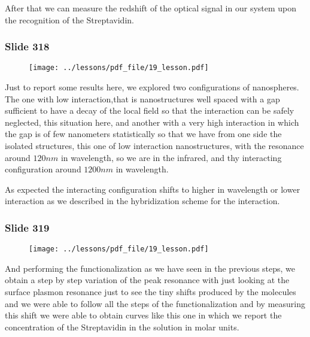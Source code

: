 \documentclass[../main/main.tex]{subfiles}
\begin{document}
After that we can measure the redshift of the optical signal in our system upon the recognition of the Streptavidin.

\newpage

\subsubsection{Slide 318}

\begin{figure}[h!]
\centering
\texttt{[image: ../lessons/pdf\_file/19\_lesson.pdf]}
\end{figure}

Just to report some results here, we explored two configurations of nanospheres. The one with low interaction,that is nanostructures well spaced with a gap sufficient to have a decay of the local field so that the interaction can be safely neglected, this situation here, and another with a very high interaction in which the gap is of few nanometers statistically so that we have from one side the isolated structures, this one of low interaction nanostructures, with the resonance around $120 nm$ in wavelength, so we are in the infrared, and thy interacting configuration around $1200 nm$ in wavelength.

As expected the interacting configuration shifts to higher in wavelength or lower interaction as we described in the hybridization scheme for the interaction.

\newpage

\subsubsection{Slide 319}

\begin{figure}[h!]
\centering
\texttt{[image: ../lessons/pdf\_file/19\_lesson.pdf]}
\end{figure}

And performing the functionalization as we have seen in the previous steps, we obtain a step by step variation of the peak resonance with just looking at the surface plasmon resonance just to see the tiny shifts produced by the molecules and we were able to follow all the steps of the functionalization and by measuring this shift we were able to obtain curves like this one in which we report the concentration of the Streptavidin in the solution in molar units.

\newpage
\end{document}
